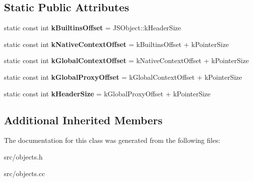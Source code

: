 \subsection*{Static Public Attributes}
\begin{DoxyCompactItemize}
\item 
\hypertarget{classv8_1_1internal_1_1_global_object_a2b5b003d16982371980db54469ad02d9}{}static const int {\bfseries k\+Builtins\+Offset} = J\+S\+Object\+::k\+Header\+Size\label{classv8_1_1internal_1_1_global_object_a2b5b003d16982371980db54469ad02d9}

\item 
\hypertarget{classv8_1_1internal_1_1_global_object_a5e3450bc531470b6fc402a22194e4d47}{}static const int {\bfseries k\+Native\+Context\+Offset} = k\+Builtins\+Offset + k\+Pointer\+Size\label{classv8_1_1internal_1_1_global_object_a5e3450bc531470b6fc402a22194e4d47}

\item 
\hypertarget{classv8_1_1internal_1_1_global_object_a50eeb8c2e56067b678915f8f065b986e}{}static const int {\bfseries k\+Global\+Context\+Offset} = k\+Native\+Context\+Offset + k\+Pointer\+Size\label{classv8_1_1internal_1_1_global_object_a50eeb8c2e56067b678915f8f065b986e}

\item 
\hypertarget{classv8_1_1internal_1_1_global_object_ae4894390e20e273ff36d6c0116885703}{}static const int {\bfseries k\+Global\+Proxy\+Offset} = k\+Global\+Context\+Offset + k\+Pointer\+Size\label{classv8_1_1internal_1_1_global_object_ae4894390e20e273ff36d6c0116885703}

\item 
\hypertarget{classv8_1_1internal_1_1_global_object_a84d8bb870d814fe82540484cfc09f777}{}static const int {\bfseries k\+Header\+Size} = k\+Global\+Proxy\+Offset + k\+Pointer\+Size\label{classv8_1_1internal_1_1_global_object_a84d8bb870d814fe82540484cfc09f777}

\end{DoxyCompactItemize}
\subsection*{Additional Inherited Members}


The documentation for this class was generated from the following files\+:\begin{DoxyCompactItemize}
\item 
src/objects.\+h\item 
src/objects.\+cc\end{DoxyCompactItemize}
